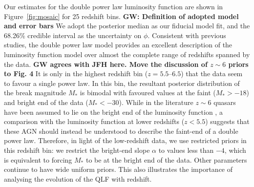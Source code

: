 \documentclass[fleqn,usenatbib]{mnras}
\begin{document}
Our estimates for the double power law luminosity function are shown
in Figure~\ref{fig:mosaic} for 25 redshift bins.
\textbf{GW: Definition of adopted model and error bars}
We adopt the posterior median as our fiducial model fit, and the 68.26\% credible interval as the uncertainty on $\phi$.
Consistent with previous studies, the double power law model provides an excellent
description of the luminosity function model over almost the complete
range of redshifts spanned by the data.
\textbf{GW agrees with JFH here. Move the discussion of $z\sim 6$ priors to Fig. 4}
It is only in the highest
redshift bin ($z=5.5$--$6.5$) that the data seem to favour a single
power law.  In this bin, the resultant posterior distribution of the
break magnitude $M_*$ is bimodal with favoured values at the faint
($M_*>-18$) and bright end of the data ($M_*<-30$).  While in the
literature $z\sim 6$ quasars have been assumed to lie on the bright
end of the luminosity function \citep[e.g.,][]{2016ApJ...833..222J}, a
comparison with the luminosity function at lower redshifts ($z<5.5$)
suggests that these AGN should instead be understood to describe the
faint-end of a double power law.
Therefore, in light of the
low-redshift data, we use restricted priors in this
redshift bin: we
restrict the bright-end slope $\alpha$ to values less than $-4$,
which
is equivalent to forcing $M_*$ to be at the bright end of the data.
Other parameters continue to have wide uniform priors.  This also
illustrates the importance of analysing the evolution of the QLF with
redshift.
\end{document}
